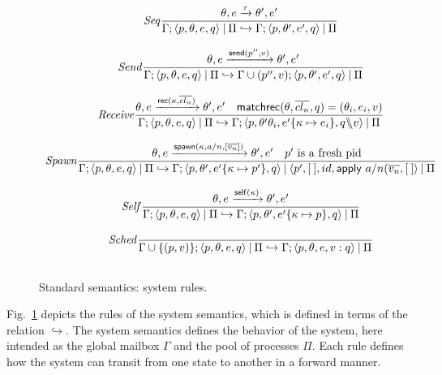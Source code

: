 \documentclass[runningheads]{llncs}
\newcommand{\sslash}{\mathbin{\mkern-4mu \backslash \mkern-6mu \backslash \mkern-4mu}}
\newcommand{\arro}[1]{\xrightarrow{#1}}
\newcommand{\hoo}{\hookrightarrow}
\newcommand{\comp}{\:|\:}
\newcommand{\rfpair}[2]{(#1,#2)}
\newcommand{\set}[1]{\{#1\}}
\newcommand{\ms}[1]{\mathsf{#1}}
\let\l=\langle
\let\r=\rangle
\newcommand{\nill}{[\:]}
\begin{document}
\begin{figure}[t]
\small
\centering
  $
	\begin{array}{c}
	\displaystyle

	\mathit{Seq}
	\frac{\theta,e\xrightarrow{\tau}\theta',e'}
	{\Gamma;\l p,\theta,e,q\r \comp \Pi \hoo \Gamma;\l p,\theta',e',q\r \comp \Pi}\\[4ex]

	\displaystyle

	\mathit{Send}
	\frac{\theta,e \arro{\ms{send}(p'',v)}\theta',e'}
	{\Gamma;\l p,\theta,e,q\r \comp \Pi \hoo \Gamma \cup (p'',v);\l p,\theta',e',q\r \comp \Pi}\\[4ex]
  
  	\displaystyle

	\mathit{Receive}
	\frac{\theta,e \arro{\ms{rec}(\kappa,\overline{cl_n})}\theta',e'~~~\ms{matchrec}(\theta,\overline{cl_n},q)=(\theta_i,e_i,v)}
	{\Gamma;\l p,\theta,e,q\r \comp \Pi \hoo \Gamma;\l p,\theta'\theta_i,e'\{\kappa \mapsto e_i\},q \sslash v \r \comp \Pi}\\[4ex]

  	\displaystyle

	\mathit{Spawn}
	\frac{\theta,e \arro{\ms{spawn}(\kappa,a/n,[\overline{v_n}])}\theta',e'~~~p'\text{ is a fresh pid}}
	{\Gamma;\l p,\theta,e,q\r \comp \Pi \hoo \Gamma;\l p,\theta',e'\{\kappa \mapsto p'\},q \r \comp \l p', \nill, id,\ms{apply}~a/n(\overline{v_n}, \nill \r \comp \Pi }\\[4ex]
	
	\displaystyle

	\mathit{Self}
	\frac{\theta,e \arro{\ms{self}(\kappa)}\theta',e'}
	{\Gamma;\l p,\theta,e,q\r \comp \Pi \hoo \Gamma;\l p,\theta',e'\{\kappa \mapsto p\},q \r \comp \Pi }\\[4ex]
	
	\displaystyle

	\mathit{Sched}
	\frac{}
	{\Gamma\cup \set{\rfpair{p}{v}} ;\l p,\theta,e,q\r \comp \Pi \hoo \Gamma;\l p,\theta,e, v:q \r \comp \Pi }\\[4ex]
	
	\end{array}
  $
\caption{Standard semantics: system rules.}
\label{fig:sys-semantics}
\end{figure}

Fig.~\ref{fig:sys-semantics} depicts the rules of the system semantics, which is
defined in terms of the relation $\hoo$. The
system semantics defines the behavior of the system, here intended as the
global mailbox $\Gamma$ and the pool of processes $\Pi$. Each rule defines how
the system can transit from one state to another in a forward manner.
\end{document}
